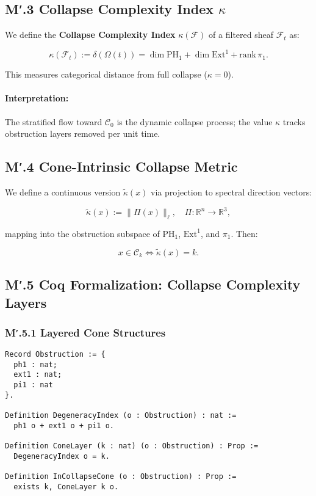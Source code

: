 \documentclass[11pt]{article}
\begin{document}
\subsection*{M′.3 Collapse Complexity Index \( \kappa \)}

We define the \textbf{Collapse Complexity Index} \( \kappa(\mathcal{F}) \) of a filtered sheaf \( \mathcal{F}_t \) as:

\[
\kappa(\mathcal{F}_t) := \delta(\Omega(t)) = \dim \mathrm{PH}_1 + \dim \mathrm{Ext}^1 + \mathrm{rank}\, \pi_1.
\]

This measures categorical distance from full collapse (\( \kappa = 0 \)).

\paragraph{Interpretation:}  
The stratified flow toward \( \mathcal{C}_0 \) is the dynamic collapse process; the value \( \kappa \) tracks obstruction layers removed per unit time.

\subsection*{M′.4 Cone-Intrinsic Collapse Metric}

We define a continuous version \( \tilde{\kappa}(x) \) via projection to spectral direction vectors:

\[
\tilde{\kappa}(x) := \|\Pi(x)\|_\ell,
\quad \Pi : \mathbb{R}^n \to \mathbb{R}^3,
\]

mapping into the obstruction subspace of \( \mathrm{PH}_1 \), \( \mathrm{Ext}^1 \), and \( \pi_1 \). Then:


\[
x \in \mathcal{C}_k \iff \tilde{\kappa}(x) = k.
\]

\subsection*{M′.5 Coq Formalization: Collapse Complexity Layers}

\subsubsection*{M′.5.1 Layered Cone Structures}

\begin{lstlisting}[language=Coq, caption=Collapse Cone Stratification and κ-index, captionpos=b]
Record Obstruction := {
  ph1 : nat;
  ext1 : nat;
  pi1 : nat
}.

Definition DegeneracyIndex (o : Obstruction) : nat :=
  ph1 o + ext1 o + pi1 o.

Definition ConeLayer (k : nat) (o : Obstruction) : Prop :=
  DegeneracyIndex o = k.

Definition InCollapseCone (o : Obstruction) : Prop :=
  exists k, ConeLayer k o.
\end{lstlisting}
\end{document}
